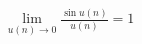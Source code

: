 \documentclass[preview]{standalone}
\begin{document}
\begin{align*}
\lim_{u(n) \to 0} \frac {\sin u(n)} {u(n)} = 1
\end{align*}
\end{document}
